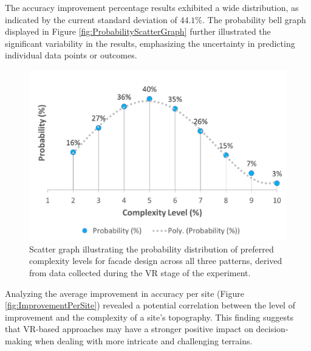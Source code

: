 The accuracy improvement percentage results exhibited a wide distribution, as indicated by the current standard deviation of \(44.1\%\).
The probability bell graph displayed in Figure \ref{fig:ProbabilityScatterGraph} further illustrated the significant variability in the results, emphasizing the uncertainty in predicting individual data points or outcomes.


    \begin{figure}[htb]
        \centering
        \includegraphics[width=\linewidth]{Images/ProbabilityPreferredComplexitylevel}
        \caption{Scatter graph illustrating the probability distribution of preferred complexity levels for facade design across all three patterns, derived from data collected during the VR stage of the experiment.}
        \label{fig:ProbabilityComplexitylevelChart}
    \end{figure}

Analyzing the average improvement in accuracy per site (Figure \ref{fig:ImprovementPerSite}) revealed a potential correlation between the level of improvement and the complexity of a site's topography.
This finding suggests that VR-based approaches may have a stronger positive impact on decision-making when dealing with more intricate and challenging terrains.

